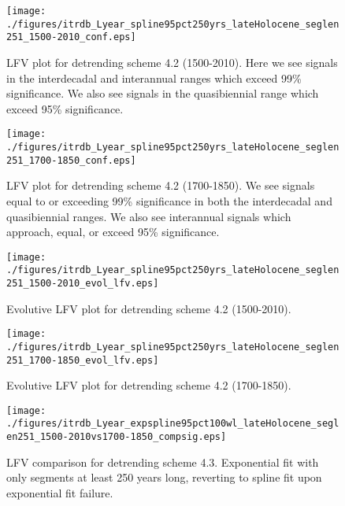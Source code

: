 \documentclass[phd,tocprelim]{cornell}
\begin{document}
\begin{figure}[!tbp]
\centering
\begin{minipage}[b]{0.45\textwidth}
\texttt{[image: ./figures/itrdb\_Lyear\_spline95pct250yrs\_lateHolocene\_seglen251\_1500-2010\_conf.eps]}
\caption{LFV plot for detrending scheme 4.2 (1500-2010). Here we see signals in the interdecadal and interannual ranges which exceed 99\% significance. We also see signals in the quasibiennial range which exceed 95\% significance.}
\label{conf4.2:1500}
\end{minipage}
\hfill
\begin{minipage}[b]{0.45\textwidth}
\texttt{[image: ./figures/itrdb\_Lyear\_spline95pct250yrs\_lateHolocene\_seglen251\_1700-1850\_conf.eps]}
\caption{LFV plot for detrending scheme 4.2 (1700-1850). We see signals equal to or exceeding 99\% significance in both the interdecadal and quasibiennial ranges. We also see interannual signals which approach, equal, or exceed 95\% significance.}
\label{conf4.2:1700}
\end{minipage}
\end{figure}

\begin{figure}[!tbp]
\centering
\begin{minipage}[b]{0.45\textwidth}
\texttt{[image: ./figures/itrdb\_Lyear\_spline95pct250yrs\_lateHolocene\_seglen251\_1500-2010\_evol\_lfv.eps]}

\caption{Evolutive LFV plot for detrending scheme 4.2 (1500-2010).}
\label{evol4.2:1500}

\end{minipage}
\hfill
\begin{minipage}[b]{0.45\textwidth}
\texttt{[image: ./figures/itrdb\_Lyear\_spline95pct250yrs\_lateHolocene\_seglen251\_1700-1850\_evol\_lfv.eps]}
\caption{Evolutive LFV plot for detrending scheme 4.2 (1700-1850).}
\label{evol4.2:1700}
\end{minipage}
\end{figure}


\begin{figure}[!tbp]
\centering
\texttt{[image: ./figures/itrdb\_Lyear\_expspline95pct100wl\_lateHolocene\_seglen251\_1500-2010vs1700-1850\_compsig.eps]}

\noindent{}

\caption{LFV comparison for detrending scheme 4.3. Exponential fit with only segments at least 250 years long, reverting to spline fit upon exponential fit failure.}

\label{compsig4.3}
\end{figure}
\end{document}

